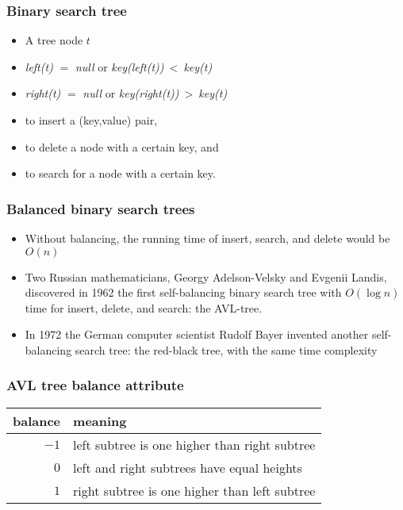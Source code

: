 \documentclass[trans]{beamer}
\begin{document}
\begin{frame}[fragile=singleslide]
\frametitle{Binary search tree}
\begin{itemize}
\item A tree node $t$
\item {\em left(t)} $=$ {\em null} or {\em key(left(t))}$~<~${\em key(t)}
\item {\em right(t)} $=$ {\em null} or {\em key(right(t))}$~>~${\em key(t)}
\end{itemize}
\begin{itemize}
\item to {insert} a (key,value) pair,
\item to {delete} a node with a certain key, and
\item to {search} for a node with a certain key.
\end{itemize}
\end{frame}

\begin{frame}[fragile=singleslide]
\frametitle{Balanced binary search trees}
\begin{itemize}
\item Without balancing, the running time of insert, search, and delete would be $O(n)$ 
\item Two Russian mathematicians, Georgy Adelson-Velsky and Evgenii Landis, discovered in 1962 the first self-balancing binary search tree with $O(\log n)$ time for insert, delete, and search: the AVL-tree.
\item In 1972 the German computer scientist Rudolf Bayer invented another
self-balancing search tree: the red-black tree, with the same time complexity
\end{itemize}
\end{frame}

\begin{frame}[fragile=singleslide]
\frametitle{AVL tree balance attribute}
\begin{center}
\begin{tabular}{rl}
balance & meaning\\
\hline
$-1$ & left subtree is one higher than right subtree\\
$0$ & left and right subtrees have equal heights\\
$1$ & right subtree is one higher than left subtree\\
\hline
\end{tabular}
\end{center}

\end{frame}
\end{document}
